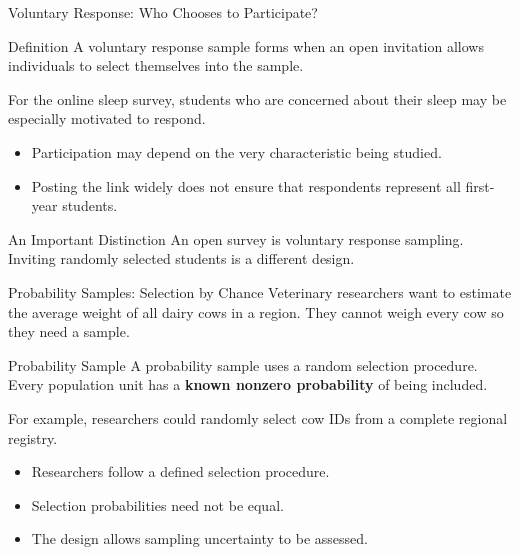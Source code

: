 \documentclass[aspectratio=169]{beamer}
\begin{document}
\begin{frame}{Voluntary Response: Who Chooses to Participate?}
\begin{block}{Definition}
A voluntary response sample forms when an open invitation allows individuals to select themselves into the sample.
\end{block}

For the online sleep survey, students who are concerned about their sleep may be especially motivated to respond.

\begin{itemize}
	\item Participation may depend on the very characteristic being studied.
	\item Posting the link widely does not ensure that respondents represent all first-year students.
\end{itemize}

\begin{alertblock}{An Important Distinction}
An open survey is voluntary response sampling. Inviting randomly selected students is a different design.
\end{alertblock}
\end{frame}

\begin{frame}{Probability Samples: Selection by Chance}
Veterinary researchers want to estimate the average weight of all dairy cows in a region. They cannot weigh every cow so they need a sample.

\begin{block}{Probability Sample}
A probability sample uses a random selection procedure. Every population unit has a \textbf{known nonzero probability} of being included.
\end{block}

For example, researchers could randomly select cow IDs from a complete regional registry.
\begin{itemize}
  \item Researchers follow a defined selection procedure.
  \item Selection probabilities need not be equal.
  \item The design allows sampling uncertainty to be assessed.
\end{itemize}
\end{frame}
\end{document}
